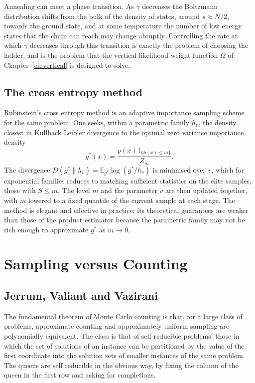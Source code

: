 \documentclass[11pt,twoside,openany]{book}
\theoremstyle{plain}
\theoremstyle{definition}
\theoremstyle{remark}
\newcommand{\EE}{\mathbb{E}}
\newcommand{\Ind}{\mathbb{I}}
\begin{document}
Annealing can meet a phase transition. As $\gamma$ decreases the Boltzmann distribution shifts from the bulk of the density of states, around $s \approx N/2$, towards the ground state, and at some temperature the number of low energy states that the chain can reach may change abruptly. Controlling the rate at which $\gamma$ decreases through this transition is exactly the problem of choosing the ladder, and is the problem that the vertical likelihood weight function $\Omega$ of Chapter~\ref{ch:vertical} is designed to solve.

\section{The cross entropy method}

Rubinstein's cross entropy method is an adaptive importance sampling scheme for the same problem. One seeks, within a parametric family $h_v$, the density closest in Kullback Leibler divergence to the optimal zero variance importance density
\[
g^*(x) = \frac{p(x) \, \Ind_{\{S(x) \le m\}}}{Z_m} .
\]
The divergence $D(g^* \| h_v) = \EE_{g^*} \log( g^* / h_v )$ is minimised over $v$, which for exponential families reduces to matching sufficient statistics on the elite samples, those with $S \le m$. The level $m$ and the parameter $v$ are then updated together, with $m$ lowered to a fixed quantile of the current sample at each stage. The method is elegant and effective in practice; its theoretical guarantees are weaker than those of the product estimator because the parametric family may not be rich enough to approximate $g^*$ as $m \to 0$.









\chapter{Sampling versus Counting}
\label{ch:jvv}

\section{Jerrum, Valiant and Vazirani}

The fundamental theorem of Monte Carlo counting is that, for a large class of problems, approximate counting and approximately uniform sampling are polynomially equivalent. The class is that of self reducible problems: those in which the set of solutions of an instance can be partitioned by the value of the first coordinate into the solution sets of smaller instances of the same problem. The queens are self reducible in the obvious way, by fixing the column of the queen in the first row and asking for completions.
\end{document}
